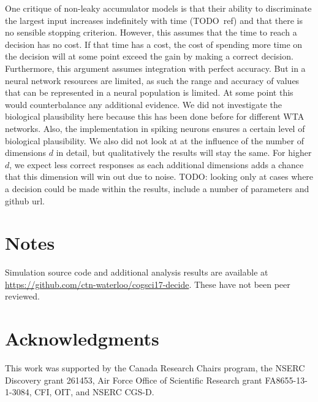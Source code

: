 \documentclass[10pt,letterpaper]{article}
\begin{document}
One critique of non-leaky accumulator models is that their ability to discriminate the largest input increases indefinitely with time (TODO~ref) and that there is no sensible stopping criterion.
However, this assumes that the time to reach a decision has no cost.
If that time has a cost, the cost of spending more time on the decision will at some point exceed the gain by making a correct decision.
Furthermore, this argument assumes integration with perfect accuracy.
But in a neural network resources are limited, as such the range and accuracy of values that can be represented in a neural population is limited.
At some point this would counterbalance any additional evidence.
We did not investigate the biological plausibility here because this has been done before for different WTA networks.
Also, the implementation in spiking neurons ensures a certain level of biological plausibility.
We also did not look at at the influence of the number of dimensions $d$ in detail, but qualitatively the results will stay the same.
For higher $d$, we expect less correct responses as each additional dimensions adds a chance that this dimension will win out due to noise.
TODO\@: looking only at cases where a decision could be made within the results, 
include a number of parameters and github url.

\section{Notes}
Simulation source code and additional analysis results are available at \url{https://github.com/ctn-waterloo/cogsci17-decide}.
These have not been peer reviewed.

\section{Acknowledgments}
This work was supported by the Canada Research Chairs program,
the NSERC Discovery grant 261453, Air Force Office of Scientific Research grant FA8655-13-1-3084, CFI, OIT, and NSERC CGS-D\@.  %



\setlength{\bibleftmargin}{.125in}
\setlength{\bibindent}{-\bibleftmargin}


\end{document}
